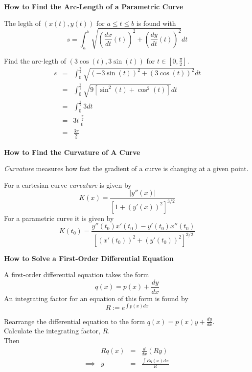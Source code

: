 \documentclass[11pt,a4paper]{article}
\begin{document}
\textbf{How to Find the Arc-Length of a Parametric Curve}\\

\subtitle{Process}
The legth of $(x(t), y(t))$ for $a \leq t \leq b$ is found with
$$s = \int_a^b \sqrt{\left(\frac{dx}{dt}(t)\right)^2 + \left(\frac{dy}{dt}(t)\right)^2}dt$$

\subtitle{Example}
Find the arc-legth of $(3\cos(t), 3\sin(t))$ for $t \in \left[0, \frac{\pi}{2}\right]$.
\[\begin{array}{rcl}
s &=& \int_0^{\frac{\pi}{2}} \sqrt{\left(-3\sin(t)\right)^2 + \left(3\cos(t)\right)^2}dt\\
&=& \int_0^{\frac{\pi}{2}} \sqrt{9\left[\sin^2(t) + \cos^2(t)\right]}dt\\
&=& \int_0^{\frac{\pi}{2}} 3 dt\\
&=& 3t\big|_0^\frac{\pi}{2}\\
&=& \underline{\frac{3\pi}{2}}
\end{array}\]

\textbf{How to Find the Curvature of A Curve}\\

\subtitle{Theory}
\textit{Curvature} measures how fast the gradient of a curve is changing at a given point.\\

\subtitle{Process}
For a cartesian curve \textit{curvature} is given by
$$K(x) = \displaystyle{\frac{|y''(x)|}{\left[1 + \left(y'(x)\right)^2\right]^{3/2}}}$$
For a parametric curve it is given by
$$K(t_0) = \displaystyle{\frac{y''(t_0)x'(t_0) - y'(t_0)x''(t_0)}{\left[\left(x'(t_0)\right)^2 + \left(y'(t_0)\right)^2\right]^{3/2}}}$$

\textbf{How to Solve a First-Order Differential Equation}\\

\subtitle{Theory}
A first-order differential equation takes the form
$$q(x) = p(x) + \frac{dy}{dx}$$
An integrating factor for an equation of this form is found by
$$R := e^{\int p(x)dx}$$

\subtitle{Process}
Rearrange the differential equation to the form $q(x) = p(x)y + \frac{dy}{dx}$.\\
Calculate the integrating factor, $R$.\\
Then\[\begin{array}{rrcl}
&Rq(x)&=&\frac{d}{dx}(Ry)\\
\implies& y &=& \displaystyle{\frac{\int Rq(x) dx}{R}}
\end{array}\]
\end{document}
